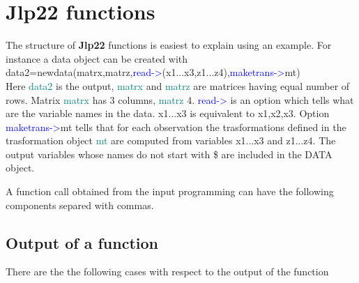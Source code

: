 \section{\textbf{Jlp22} functions}
\label{jfuncs0}
The structure of \textbf{Jlp22} functions is easiest to explain using an example.
For instance a data object can be created with \\
data2=\textcolor{VioletRed}{newdata}(matrx,matrz,\textcolor{blue}{read->}(x1...x3,z1...z4),\textcolor{blue}{maketrans->}mt) \\
Here \textcolor{teal}{data2} is the output, \textcolor{teal}{matrx} and \textcolor{teal}{matrz} are matrices having equal number of rows. Matrix
\textcolor{teal}{matrx} has 3 columns, \textcolor{teal}{matrz} 4. \textcolor{blue}{read->} is an option which tells
what are the variable names in the data. x1...x3 is equivalent to x1,x2,x3.  Option
\textcolor{blue}{maketrans->}mt tells that for each observation the trasformations defined in the trasformation
object \textcolor{teal}{mt} are computed from variables x1...x3 and z1...z4. The output variables
whose names do not start with \$ are included in the DATA object.


A function call obtained from the  input programming can have the
following components separed with commas.
\subsection{Output of a function}
\label{output}

There are the the following cases with respect to
the output of the function


